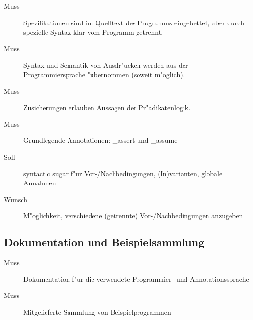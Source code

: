 \begin{description}%
    \item [Muss] Spezifikationen sind im Quelltext des Programms eingebettet, aber durch spezielle Syntax klar vom Programm getrennt.%
    \item [Muss] Syntax und Semantik von Ausdr"ucken werden aus der Programmiersprache "ubernommen (soweit m"oglich).%
    \item [Muss] Zusicherungen erlauben Aussagen der \see Pr"adikatenlogik.%
    \item [Muss] Grundlegende Annotationen: \textup{\_assert} und \textup{\_assume}%
    \item [Soll] syntactic sugar f"ur \see Vor-/Nachbedingungen, \see (In)varianten, \see globale Annahmen%
    \item [Wunsch] M"oglichkeit, verschiedene (getrennte) Vor-/Nachbedingungen anzugeben%
\end{description}%

\subsection{Dokumentation und Beispielsammlung}%

\begin{description}%
    \item [Muss] Dokumentation f"ur die verwendete Programmier- und Annotationssprache%
    \item [Muss] Mitgelieferte Sammlung von Beispielprogrammen%
\end{description}%
